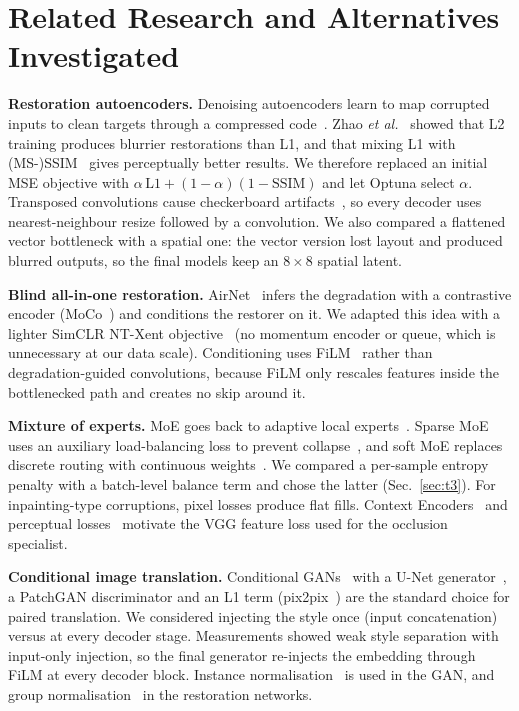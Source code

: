 \documentclass[conference]{IEEEtran}
\newcommand{\ssim}{\mathrm{SSIM}}
\begin{document}
\section{Related Research and Alternatives Investigated}
\textbf{Restoration autoencoders.} Denoising autoencoders learn to map corrupted inputs to clean targets through a compressed code~\cite{vincent2010}. Zhao \emph{et al.}~\cite{zhao2017loss} showed that L2 training produces blurrier restorations than L1, and that mixing L1 with (MS-)SSIM~\cite{wang2004ssim} gives perceptually better results. We therefore replaced an initial MSE objective with $\alpha\,\mathrm{L1}+(1-\alpha)(1-\ssim)$ and let Optuna select $\alpha$. Transposed convolutions cause checkerboard artifacts~\cite{odena2016}, so every decoder uses nearest-neighbour resize followed by a convolution. We also compared a flattened vector bottleneck with a spatial one: the vector version lost layout and produced blurred outputs, so the final models keep an $8{\times}8$ spatial latent.

\textbf{Blind all-in-one restoration.} AirNet~\cite{li2022airnet} infers the degradation with a contrastive encoder (MoCo~\cite{he2020moco}) and conditions the restorer on it. We adapted this idea with a lighter SimCLR NT-Xent objective~\cite{chen2020simclr} (no momentum encoder or queue, which is unnecessary at our data scale). Conditioning uses FiLM~\cite{perez2018film} rather than degradation-guided convolutions, because FiLM only rescales features inside the bottlenecked path and creates no skip around it.

\textbf{Mixture of experts.} MoE goes back to adaptive local experts~\cite{jacobs1991}. Sparse MoE uses an auxiliary load-balancing loss to prevent collapse~\cite{shazeer2017,fedus2022switch}, and soft MoE replaces discrete routing with continuous weights~\cite{puigcerver2024soft}. We compared a per-sample entropy penalty with a batch-level balance term and chose the latter (Sec.~\ref{sec:t3}). For inpainting-type corruptions, pixel losses produce flat fills. Context Encoders~\cite{pathak2016} and perceptual losses~\cite{johnson2016perceptual} motivate the VGG feature loss used for the occlusion specialist.

\textbf{Conditional image translation.} Conditional GANs~\cite{goodfellow2014gan,mirza2014cgan} with a U-Net generator~\cite{ronneberger2015unet}, a PatchGAN discriminator and an L1 term (pix2pix~\cite{isola2017}) are the standard choice for paired translation. We considered injecting the style once (input concatenation) versus at every decoder stage. Measurements showed weak style separation with input-only injection, so the final generator re-injects the embedding through FiLM at every decoder block. Instance normalisation~\cite{ulyanov2016instance} is used in the GAN, and group normalisation~\cite{wu2018gn} in the restoration networks.
\end{document}
